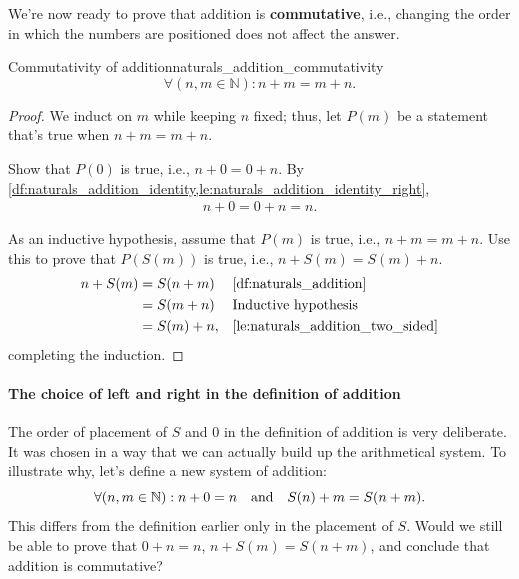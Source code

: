 We're now ready to prove that addition is \textbf{commutative}, i.e., changing the order in which
the numbers are positioned does not affect the answer.
\begin{lemma}{Commutativity of addition}{naturals_addition_commutativity}
  \begin{equation*}
    \forall (n, m \in \mathbb{N}) : n + m = m + n.
  \end{equation*}
\end{lemma}
\begin{proof}
  We induct on \(m\) while keeping \(n\) fixed; thus, let \(P(m)\) be a statement that's true when
  \(n + m = m + n\).

  \basecase Show that \(P(0)\) is true, i.e., \(n + 0 = 0 + n\). By
  \cref{df:naturals_addition_identity,le:naturals_addition_identity_right},
  \begin{align}
    n + 0 = 0 + n = n.
  \end{align}

  \inductivestep As an inductive hypothesis, assume that \(P(m)\) is true, i.e., \(n + m = m + n\).
  Use this to prove that \(P(S(m))\) is true, i.e., \(n + S(m) = S(m) + n\).
  \begin{align}
    n + S(m) & = S(n + m)  &  & \textrm{\Cref{df:naturals_addition}}           \\
             & = S(m + n)  &  & \textrm{Inductive hypothesis}                  \\
             & = S(m) + n, &  & \textrm{\Cref{le:naturals_addition_two_sided}}
  \end{align}
  completing the induction.
\end{proof}

\paragraph{The choice of left and right in the definition of addition}

The order of placement of \(S\) and \(0\) in the definition of addition is very
deliberate. It was chosen in a way that we can actually build up the arithmetical
system. To illustrate why, let's define a new system of addition:
\begin{equation}
  \forall (n, m \in \mathbb{N}) : n + 0 = n \quad\textrm{and}\quad S(n) + m = S(n + m).
\end{equation}
This differs from the definition earlier only in the placement of \(S\). Would we still
be able to prove that \(0 + n = n\), \(n + S(m) = S(n + m)\), and conclude that
addition is commutative?

